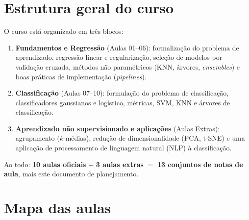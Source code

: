 \documentclass[11pt,a4paper]{article}
\begin{document}
\section{Estrutura geral do curso}
O curso está organizado em três blocos:
\begin{enumerate}[label=\textbf{\Roman*.}]
  \item \textbf{Fundamentos e Regressão} (Aulas 01--06): formalização do problema
        de aprendizado, regressão linear e regularização, seleção de modelos por
        validação cruzada, métodos não paramétricos (KNN, árvores, \emph{ensembles})
        e boas práticas de implementação (\emph{pipelines}).
  \item \textbf{Classificação} (Aulas 07--10): formulação do problema de
        classificação, classificadores gaussianos e logístico, métricas, SVM, KNN
        e árvores de classificação.
  \item \textbf{Aprendizado não supervisionado e aplicações} (Aulas Extras):
        agrupamento ($k$-médias), redução de dimensionalidade (PCA, t-SNE) e uma
        aplicação de processamento de linguagem natural (NLP) à classificação.
\end{enumerate}

\noindent Ao todo: \textbf{10 aulas oficiais} $+$ \textbf{3 aulas extras}
$=$ \textbf{13 conjuntos de notas de aula}, mais este documento de planejamento.

\section{Mapa das aulas}
\end{document}
